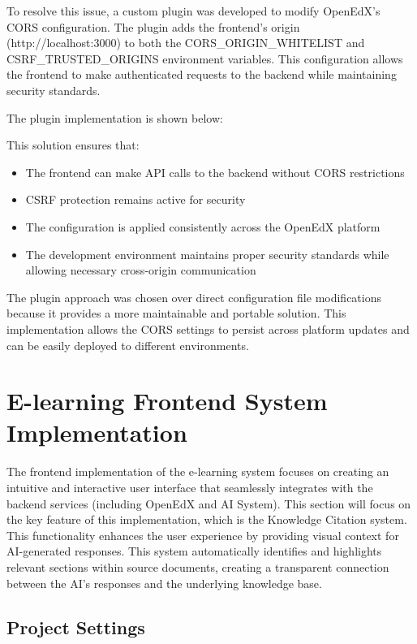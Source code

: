 \documentclass[../Main.tex]{subfiles}
\begin{document}
To resolve this issue, a custom plugin was developed to modify OpenEdX's CORS configuration. The plugin adds the frontend's origin (http://localhost:3000) to both the CORS\_ORIGIN\_WHITELIST and CSRF\_TRUSTED\_ORIGINS environment variables. This configuration allows the frontend to make authenticated requests to the backend while maintaining security standards.

The plugin implementation is shown below:



This solution ensures that:
\begin{itemize}
    \item The frontend can make API calls to the backend without CORS restrictions
    \item CSRF protection remains active for security
    \item The configuration is applied consistently across the OpenEdX platform
    \item The development environment maintains proper security standards while allowing necessary cross-origin communication
\end{itemize}

The plugin approach was chosen over direct configuration file modifications because it provides a more maintainable and portable solution. This implementation allows the CORS settings to persist across platform updates and can be easily deployed to different environments.

\section{E-learning Frontend System Implementation}
\label{section:5.3_e_learning_frontend_system_implementation}

The frontend implementation of the e-learning system focuses on creating an intuitive and interactive user interface that seamlessly integrates with the backend services (including OpenEdX and AI System). This section will focus on the key feature of this implementation, which is the Knowledge Citation system. This functionality enhances the user experience by providing visual context for AI-generated responses. This system automatically identifies and highlights relevant sections within source documents, creating a transparent connection between the AI's responses and the underlying knowledge base.


\subsection{Project Settings}
\label{section:5.3.1_project_settings}
\end{document}

